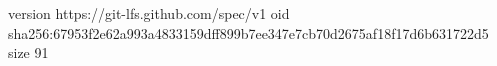 version https://git-lfs.github.com/spec/v1
oid sha256:67953f2e62a993a4833159dff899b7ee347e7cb70d2675af18f17d6b631722d5
size 91
